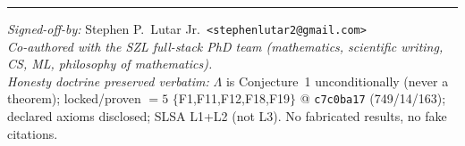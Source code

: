 \documentclass[11pt]{article}
\theoremstyle{plain}
\theoremstyle{definition}
\theoremstyle{remark}
\newcommand{\La}{\Lambda}
\begin{document}



\vspace{1.5em}\hrule\vspace{0.6em}
\noindent\small
\textit{Signed-off-by:} Stephen P.\ Lutar Jr.\ \texttt{<stephenlutar2@gmail.com>} \\
\textit{Co-authored with the SZL full-stack PhD team (mathematics, scientific writing,
CS, ML, philosophy of mathematics).} \\
\textit{Honesty doctrine preserved verbatim:} $\La$ is Conjecture~1 unconditionally
(never a theorem); locked/proven $=5$ $\{$F1,F11,F12,F18,F19$\}$ @ \texttt{c7c0ba17}
(749/14/163); declared axioms disclosed; SLSA L1+L2 (not L3). No fabricated results,
no fake citations.
\normalsize
\end{document}
